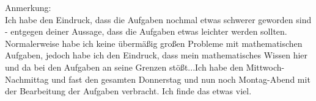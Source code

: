 \documentclass{scrartcl}
\begin{document}
\Large {Anmerkung:} \\

\normalsize
Ich habe den Eindruck, dass die Aufgaben nochmal etwas schwerer geworden sind - entgegen deiner Aussage,
dass die Aufgaben etwas leichter werden sollten. Normalerweise habe ich keine übermäßig großen Probleme mit 
mathematischen Aufgaben, jedoch habe ich den Eindruck, dass mein mathematisches Wissen hier und da bei den
Aufgaben an seine Grenzen stößt...Ich habe den Mittwoch-Nachmittag und fast den gesamten Donnerstag und nun
noch Montag-Abend mit der Bearbeitung der Aufgaben verbracht. Ich finde das etwas viel.
\end{document}
